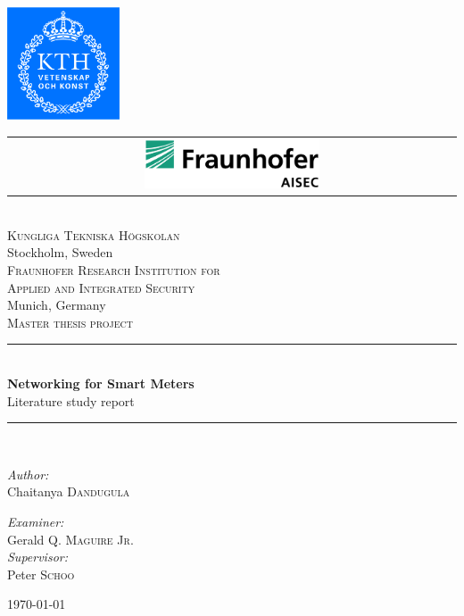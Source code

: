 \begin{titlepage}
\newcommand{\HRule}{\rule{\linewidth}{0.5mm}}
\begin{center}

\includegraphics[width=0.25\textwidth]{logo/kth_cmyk.pdf}
\begin{tabular}{ c }
\includegraphics[width=0.4\textwidth]{logo/aisec.pdf} \\[2cm]
\end{tabular}
\\[1cm]
\textsc{\LARGE Kungliga Tekniska H\"ogskolan}\\
{\large Stockholm, Sweden}\\[1.5cm]
\textsc{\LARGE Fraunhofer Research Institution for}\\ [0.25cm]
\textsc{\LARGE Applied and Integrated Security}\\
{\large Munich, Germany}\\[1.5cm]
\textsc{\Large Master thesis project}\\[0.5cm]


\HRule \\[0.4cm]
{ \huge \bfseries Networking for Smart Meters}\\[0.4cm]
{\large Literature study report}
\HRule \\[1.5cm]

\begin{minipage}{0.4\textwidth}
\begin{flushleft} \large
\emph{Author:}\\
Chaitanya \textsc{Dandugula}
\end{flushleft}
\end{minipage}
\begin{minipage}{0.4\textwidth}
\begin{flushright} \large
\emph{Examiner:} \\
Gerald \textsc{Q. Maguire Jr.}\\
\emph{Supervisor:} \\
Peter \textsc{Schoo}
\end{flushright}
\end{minipage}

\vfill

{\large \today}

\end{center}

\end{titlepage}